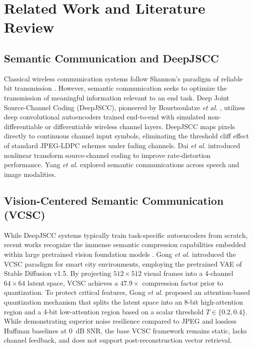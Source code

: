 \documentclass[journal,twocolumn]{IEEEtran}
\begin{document}
\section{Related Work and Literature Review}
\subsection{Semantic Communication and DeepJSCC}
Classical wireless communication systems follow Shannon's paradigm of reliable bit transmission \cite{qin2022semantic}. However, semantic communication seeks to optimize the transmission of meaningful information relevant to an end task. Deep Joint Source-Channel Coding (DeepJSCC), pioneered by Bourtsoulatze \textit{et al.} \cite{bourtsoulatze2019deep}, utilizes deep convolutional autoencoders trained end-to-end with simulated non-differentiable or differentiable wireless channel layers. DeepJSCC maps pixels directly to continuous channel input symbols, eliminating the threshold cliff effect of standard JPEG-LDPC schemes under fading channels. Dai \textit{et al.} \cite{dai2022nonlinear} introduced nonlinear transform source-channel coding to improve rate-distortion performance. Yang \textit{et al.} \cite{yang2023semantic} explored semantic communications across speech and image modalities.

\subsection{Vision-Centered Semantic Communication (VCSC)}
While DeepJSCC systems typically train task-specific autoencoders from scratch, recent works recognize the immense semantic compression capabilities embedded within large pretrained vision foundation models \cite{rombach2022high, radford2021learning}. Gong \textit{et al.} \cite{gong2026wireless} introduced the VCSC paradigm for smart city environments, employing the pretrained VAE of Stable Diffusion v1.5. By projecting $512\times 512$ visual frames into a 4-channel $64\times 64$ latent space, VCSC achieves a $47.9\times$ compression factor prior to quantization. To protect critical features, Gong \textit{et al.} proposed an attention-based quantization mechanism that splits the latent space into an 8-bit high-attention region and a 4-bit low-attention region based on a scalar threshold $T \in \{0.2, 0.4\}$. While demonstrating superior noise resilience compared to JPEG and lossless Huffman baselines at 0~dB SNR, the base VCSC framework remains static, lacks channel feedback, and does not support post-reconstruction vector retrieval.
\end{document}
